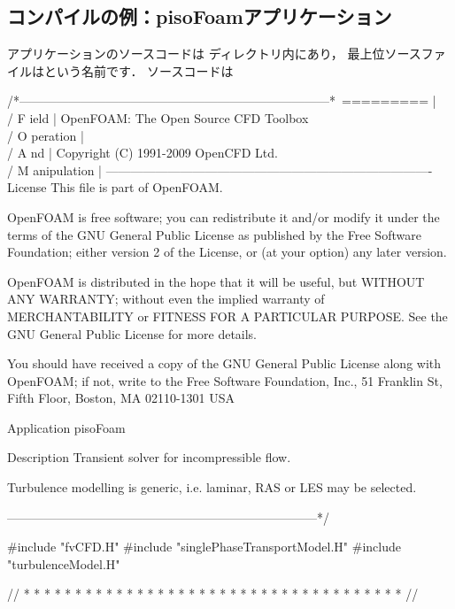 \subsection{コンパイルの例：pisoFoamアプリケーション}
\label{ssec:3.2.4}
アプリケーションのソースコードは
ディレクトリ内にあり，
最上位ソースファイルはという名前です．
ソースコードは
\begin{OFverbatim}
/*---------------------------------------------------------------------------*\
  =========                 |
  \\      /  F ield         | OpenFOAM: The Open Source CFD Toolbox
   \\    /   O peration     |
    \\  /    A nd           | Copyright (C) 1991-2009 OpenCFD Ltd.
     \\/     M anipulation  |
-------------------------------------------------------------------------------
License
    This file is part of OpenFOAM.

    OpenFOAM is free software; you can redistribute it and/or modify it
    under the terms of the GNU General Public License as published by the
    Free Software Foundation; either version 2 of the License, or (at your
    option) any later version.

    OpenFOAM is distributed in the hope that it will be useful, but WITHOUT
    ANY WARRANTY; without even the implied warranty of MERCHANTABILITY or
    FITNESS FOR A PARTICULAR PURPOSE.  See the GNU General Public License
    for more details.

    You should have received a copy of the GNU General Public License
    along with OpenFOAM; if not, write to the Free Software Foundation,
    Inc., 51 Franklin St, Fifth Floor, Boston, MA 02110-1301 USA

Application
    pisoFoam

Description
    Transient solver for incompressible flow.

    Turbulence modelling is generic, i.e. laminar, RAS or LES may be selected.

\*---------------------------------------------------------------------------*/

#include "fvCFD.H"
#include "singlePhaseTransportModel.H"
#include "turbulenceModel.H"

// * * * * * * * * * * * * * * * * * * * * * * * * * * * * * * * * * * * * * //


\end{OFverbatim}
